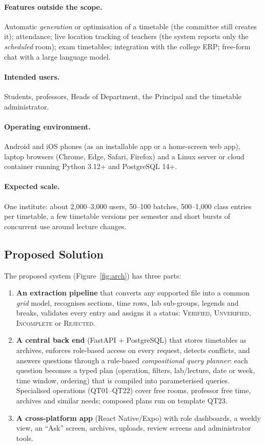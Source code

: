\paragraph{Features outside the scope.}
Automatic \emph{generation} or optimisation of a timetable (the committee still creates it);
attendance; live location tracking of teachers (the system reports only the \emph{scheduled} room);
exam timetables; integration with the college ERP; free-form chat with a large language model.

\paragraph{Intended users.}
Students, professors, Heads of Department, the Principal and the timetable administrator.

\paragraph{Operating environment.}
Android and iOS phones (as an installable app or a home-screen web app), laptop browsers (Chrome,
Edge, Safari, Firefox) and a Linux server or cloud container running Python 3.12+ and PostgreSQL 14+.

\paragraph{Expected scale.}
One institute: about 2{,}000--3{,}000 users, 50--100 batches, 500--1{,}000 class entries per
timetable, a few timetable versions per semester and short bursts of concurrent use around lecture
changes.

\subsection{Proposed Solution}
The proposed system (Figure~\ref{fig:arch}) has three parts:
\begin{enumerate}
\item \textbf{An extraction pipeline} that converts any supported file into a common \emph{grid}
      model, recognises sections, time rows, lab sub-groups, legends and breaks, validates every entry
      and assigns it a status: \textsc{Verified}, \textsc{Unverified}, \textsc{Incomplete} or
      \textsc{Rejected}.
\item \textbf{A central back end} (FastAPI + PostgreSQL) that stores timetables as archives, enforces
      role-based access on every request, detects conflicts, and answers questions through a
      rule-based \emph{compositional query planner}: each question becomes a typed plan (operation,
      filters, lab/lecture, date or week, time window, ordering) that is compiled into parameterised
      queries. Specialised operations (QT01--QT22) cover free rooms, professor free time, archives and
      similar needs; composed plans run on template QT23.
\item \textbf{A cross-platform app} (React Native/Expo) with role dashboards, a weekly view, an
      ``Ask'' screen, archives, uploads, review screens and administrator tools.
\end{enumerate}

